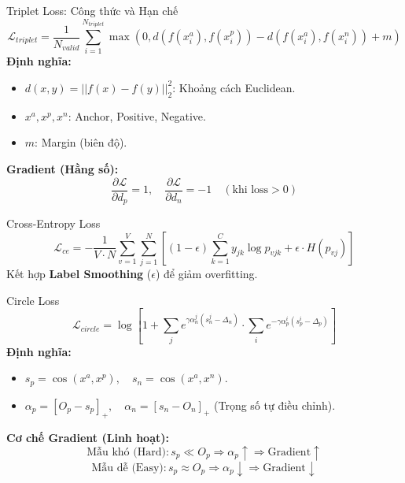 \begin{frame}{Triplet Loss: Công thức và Hạn chế}
    \begin{equation}
        \mathcal{L}_{triplet} = \frac{1}{N_{valid}} \sum_{i=1}^{N_{triplet}} \max(0, d(f(x^a_i), f(x^p_i)) - d(f(x^a_i), f(x^n_i)) + m)
    \end{equation}
    \textbf{Định nghĩa:}
    \begin{itemize}
        \item $d(x, y) = ||f(x)-f(y)||_2^2$: Khoảng cách Euclidean.
        \item $x^a, x^p, x^n$: Anchor, Positive, Negative.
        \item $m$: Margin (biên độ).
    \end{itemize}
    \textbf{Gradient (Hằng số):}
    $$ \frac{\partial \mathcal{L}}{\partial d_p} = 1, \quad \frac{\partial \mathcal{L}}{\partial d_n} = -1 \quad (\text{khi loss} > 0) $$
\end{frame}
\begin{frame}{Cross-Entropy Loss}
    \begin{equation}
        \mathcal{L}_{ce} = -\frac{1}{V \cdot N} \sum_{v=1}^{V} \sum_{j=1}^{N} \left[ (1-\epsilon) \sum_{k=1}^{C} y_{jk} \log p_{vjk} + \epsilon \cdot H(p_{vj}) \right]
    \end{equation}
    Kết hợp \textbf{Label Smoothing} ($\epsilon$) để giảm overfitting.
\end{frame}

\begin{frame}{Circle Loss}
    \begin{equation}
        \mathcal{L}_{circle} = \log\left[ 1 + \sum_{j} e^{\gamma \alpha_n^j (s_n^j - \Delta_n)} \cdot \sum_{i} e^{-\gamma \alpha_p^i (s_p^i - \Delta_p)} \right]
    \end{equation}
    \textbf{Định nghĩa:}
    \begin{itemize}
        \item $s_p = \cos(x^a, x^p), \quad s_n = \cos(x^a, x^n)$.
        \item $\alpha_p = [O_p - s_p]_+, \quad \alpha_n = [s_n - O_n]_+$ (Trọng số tự điều chỉnh).
    \end{itemize}
    \textbf{Cơ chế Gradient (Linh hoạt):}
    $$ \text{Mẫu khó (Hard)}: s_p \ll O_p \Rightarrow \alpha_p \uparrow \Rightarrow \text{Gradient} \uparrow $$
    $$ \text{Mẫu dễ (Easy)}: s_p \approx O_p \Rightarrow \alpha_p \downarrow \Rightarrow \text{Gradient} \downarrow $$
\end{frame}


